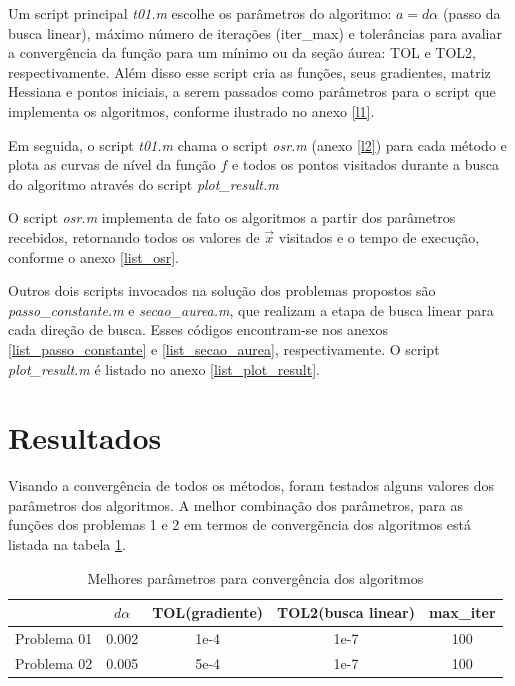 \documentclass[10pt, a4paper]{article}
\begin{document}
Um script principal \textit{t01.m} escolhe os par\^ametros do algoritmo: $a=d\alpha$ (passo da busca linear), m\'aximo n\'umero de itera\c c\~oes (iter\_max) e toler\^ancias para avaliar a converg\^encia da fun\c c\~ao para um m\'inimo ou da se\c c\~ao \'aurea: TOL e TOL2, respectivamente. Al\'em disso esse script cria as fun\c c\~oes, seus gradientes, matriz Hessiana e pontos iniciais, a serem passados como par\^ametros para o script que implementa os algoritmos, conforme ilustrado no anexo \ref{l1}.

Em seguida, o script \textit{t01.m} chama o script \textit{osr.m} (anexo \ref{l2}) para cada m\'etodo e plota as curvas de n\'ivel da fun\c c\~ao $f$ e todos os pontos visitados durante a busca do algoritmo atrav\'es do script \textit{plot\_result.m}

O script \textit{osr.m} implementa de fato os algoritmos a partir dos par\^ametros recebidos, retornando todos os valores de $\vec{x}$ visitados e o tempo de execu\c c\~ao, conforme o anexo \ref{list_osr}.

Outros dois scripts invocados na solu\c c\~ao dos problemas propostos s\~ao \textit{passo\_constante.m} e \textit{secao\_aurea.m}, que realizam a etapa de busca linear para cada dire\c c\~ao de busca. Esses c\'odigos encontram-se nos anexos \ref{list_passo_constante} e \ref{list_secao_aurea}, respectivamente. O script \textit{plot\_result.m} \'e listado no anexo \ref{list_plot_result}.

\section{Resultados}

Visando a converg\^encia de todos os m\'etodos, foram testados alguns valores dos par\^ametros dos algoritmos. A melhor combina\c c\~ao dos par\^ametros, para as fun\c c\~oes dos problemas 1 e 2 em termos de converg\~encia dos algoritmos est\'a listada na tabela \ref{table:params}.

\begin{table}[H]
      \small
      \centering
      \caption{Melhores par\^ametros para converg\^encia dos algoritmos}
      \begin{tabular}{c|c|c|c|c}
                        & $d\alpha$ & TOL(gradiente) & TOL2(busca linear) & max\_iter \\
            \hline
            Problema 01 & 0.002 & 1e-4 & 1e-7 & 100 \\
            Problema 02 & 0.005 & 5e-4 & 1e-7 & 100 \\
      \end{tabular}
      \label{table:params}
\end{table}
\end{document}
